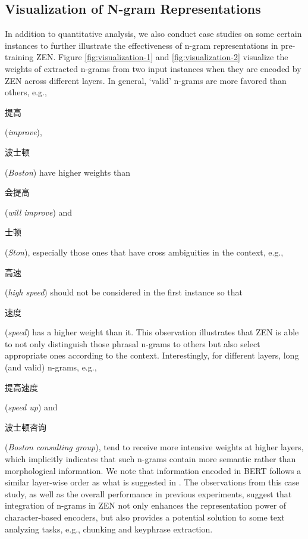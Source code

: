 \documentclass[11pt,a4paper]{article}
\begin{document}
\begin{CJK}{UTF8}{gbsn}
\subsection{Visualization of N-gram Representations}

In addition to quantitative analysis,
we also conduct case studies on some certain instances to further illustrate the effectiveness of n-gram representations in pre-training ZEN.
Figure \ref{fig:visualization-1} and \ref{fig:visualization-2} visualize the weights of extracted n-grams from two input instances when they are encoded by ZEN across different layers.
In general, `valid' n-grams are more favored than others, e.g., \begin{CJK*}{UTF8}{gkai}提高\end{CJK*} (\textit{improve}), \begin{CJK*}{UTF8}{gkai}波士顿\end{CJK*} (\textit{Boston}) have higher weights than \begin{CJK*}{UTF8}{gkai}会提高\end{CJK*} (\textit{will improve}) and \begin{CJK*}{UTF8}{gkai}士顿\end{CJK*} (\textit{Ston}),
especially those ones that have cross ambiguities in the context, e.g., \begin{CJK*}{UTF8}{gkai}高速\end{CJK*} (\textit{high speed}) should not be considered in the first instance so that \begin{CJK*}{UTF8}{gkai}速度\end{CJK*} (\textit{speed}) has a higher weight than it.
This observation illustrates that ZEN is able to not only distinguish those phrasal n-grams to others but also select appropriate ones according to the context.
Interestingly, for different layers, long (and valid) n-grams, e.g., \begin{CJK*}{UTF8}{gkai}提高速度\end{CJK*} (\textit{speed up}) and \begin{CJK*}{UTF8}{gkai}波士顿咨询\end{CJK*} (\textit{Boston consulting group}),
tend to receive more intensive weights at higher layers,
which implicitly indicates that such n-grams contain more semantic rather than morphological information. We note that information encoded in BERT follows a similar layer-wise order
as what is suggested in \citet{jawahar2019does}.
The observations from this case study, as well as the overall performance in previous experiments, suggest that integration of n-grams in ZEN not only enhances the representation power of character-based encoders, but also provides a potential solution to some text analyzing tasks, e.g., chunking and keyphrase extraction.














\end{CJK}
\end{document}
